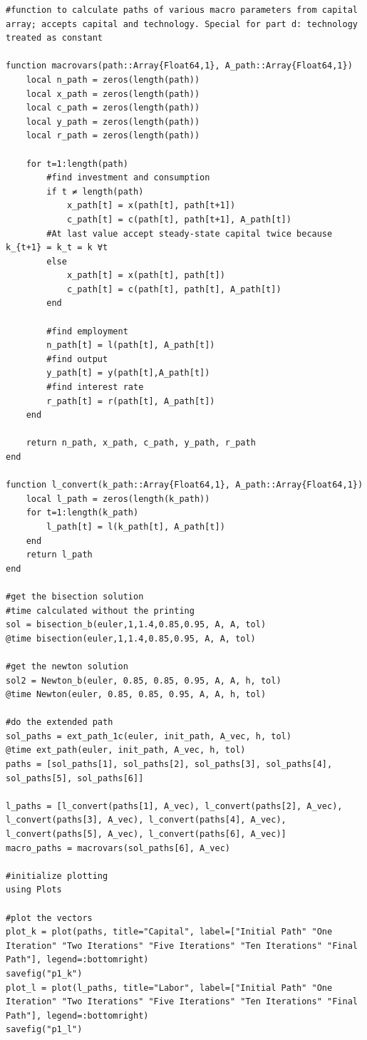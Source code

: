 \documentclass[12pt, letterpaper, parskip = full]{article}
\begin{document}
\begin{lstlisting}[breaklines]
#function to calculate paths of various macro parameters from capital array; accepts capital and technology. Special for part d: technology treated as constant

function macrovars(path::Array{Float64,1}, A_path::Array{Float64,1})
    local n_path = zeros(length(path))
    local x_path = zeros(length(path))
    local c_path = zeros(length(path))
    local y_path = zeros(length(path))
    local r_path = zeros(length(path))

    for t=1:length(path)
        #find investment and consumption
        if t ≠ length(path)
            x_path[t] = x(path[t], path[t+1])
            c_path[t] = c(path[t], path[t+1], A_path[t])
        #At last value accept steady-state capital twice because k_{t+1} = k_t = k ∀t
        else
            x_path[t] = x(path[t], path[t])
            c_path[t] = c(path[t], path[t], A_path[t])
        end

        #find employment
        n_path[t] = l(path[t], A_path[t])
        #find output
        y_path[t] = y(path[t],A_path[t])
        #find interest rate
        r_path[t] = r(path[t], A_path[t])
    end

    return n_path, x_path, c_path, y_path, r_path
end

function l_convert(k_path::Array{Float64,1}, A_path::Array{Float64,1})
    local l_path = zeros(length(k_path))
    for t=1:length(k_path)
        l_path[t] = l(k_path[t], A_path[t])
    end
    return l_path
end

#get the bisection solution
#time calculated without the printing
sol = bisection_b(euler,1,1.4,0.85,0.95, A, A, tol)
@time bisection(euler,1,1.4,0.85,0.95, A, A, tol)

#get the newton solution
sol2 = Newton_b(euler, 0.85, 0.85, 0.95, A, A, h, tol)
@time Newton(euler, 0.85, 0.85, 0.95, A, A, h, tol)

#do the extended path
sol_paths = ext_path_1c(euler, init_path, A_vec, h, tol)
@time ext_path(euler, init_path, A_vec, h, tol)
paths = [sol_paths[1], sol_paths[2], sol_paths[3], sol_paths[4], sol_paths[5], sol_paths[6]]

l_paths = [l_convert(paths[1], A_vec), l_convert(paths[2], A_vec), l_convert(paths[3], A_vec), l_convert(paths[4], A_vec), l_convert(paths[5], A_vec), l_convert(paths[6], A_vec)]
macro_paths = macrovars(sol_paths[6], A_vec)

#initialize plotting
using Plots

#plot the vectors
plot_k = plot(paths, title="Capital", label=["Initial Path" "One Iteration" "Two Iterations" "Five Iterations" "Ten Iterations" "Final Path"], legend=:bottomright)
savefig("p1_k")
plot_l = plot(l_paths, title="Labor", label=["Initial Path" "One Iteration" "Two Iterations" "Five Iterations" "Ten Iterations" "Final Path"], legend=:bottomright)
savefig("p1_l")


\end{lstlisting}
\end{document}
